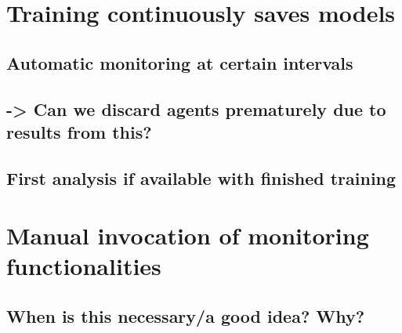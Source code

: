 \label{chapter:OurWorkflow}
\section{Training continuously saves models}
\subsection{Automatic monitoring at certain intervals}
\subsection{-> Can we discard agents prematurely due to results from this?}
\subsection{First analysis if available with finished training}

\section{Manual invocation of monitoring functionalities}
\subsection{When is this necessary/a good idea? Why?}